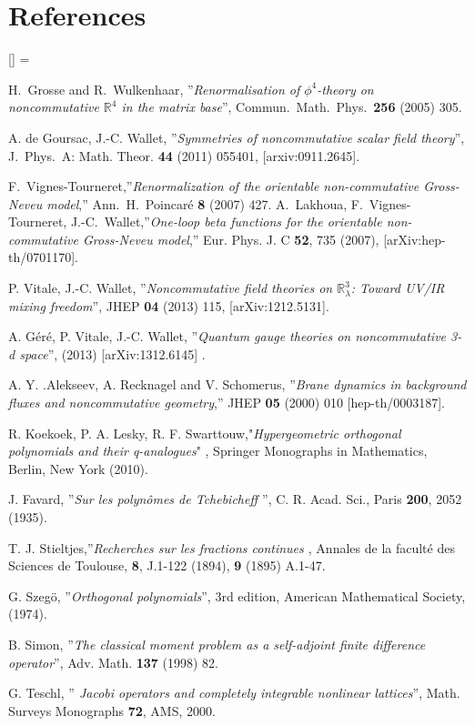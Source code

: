 \documentclass[a4paper,11pt,twoside]{article}
\numberwithin{equation}{section}
\theoremstyle{nonumberplain}
\newcounter{and}
\renewenvironment{thebibliography}[1]{%
\section*{References}%
\frenchspacing\small%
\begin{list}{[\arabic{enumi}]}%
{%
\usecounter{enumi}\parsep=2pt\topsep 0pt%
\settowidth{\labelwidth}{[#1]}%
\leftmargin=\labelwidth\advance\leftmargin\labelsep%
\rightmargin=0pt\itemsep=1pt\sloppy%
}%
}{\end{list}}
\begin{document}
\begin{thebibliography}{50}
H.~Grosse and R.~Wulkenhaar, ''{\it{Renormalisation of $\phi^4$-theory on noncommutative $\mathbb{R}^4$ in the matrix base}}'', 
Commun.\ Math.\ Phys.\  {\bf 256} (2005) 305.

 A. de Goursac, J.-C. Wallet, ''{\it{Symmetries of noncommutative scalar field theory}}'', J.\ Phys.\ A: Math. Theor. {\bf{44}} (2011) 055401, [arxiv:0911.2645]. 

F.~Vignes-Tourneret,''{\it{Renormalization of the orientable non-commutative Gross-Neveu model}},''  Ann.\ H.\ Poincar\'e {\bf{8}} (2007) 427. 
A.~Lakhoua, 
F.~Vignes-Tourneret, J.-C.~Wallet,''{\it{One-loop beta functions for the orientable non-commutative Gross-Neveu
 model}},'' Eur. Phys. J. C {\bf{52}}, 735 (2007), [arXiv:hep-th/0701170].

 P. Vitale, J.-C. Wallet, ''{\it{Noncommutative field theories on $\mathbb{R}^3_\lambda$: Toward UV/IR mixing freedom}}'', JHEP {\bf{04}} (2013) 115, [arXiv:1212.5131].

 A. G\'er\'e, P. Vitale, J.-C. Wallet, ''{\it{Quantum gauge theories on noncommutative 3-d space}}'', (2013) [arXiv:1312.6145] .

 A. Y. .Alekseev, A. Recknagel and V. Schomerus, ''{\it{Brane dynamics in background fluxes and
noncommutative geometry}},'' JHEP {\bf{05}} (2000) 010 [hep-th/0003187].

 R. Koekoek, P. A.  Lesky, R. F. Swarttouw,"{\it{Hypergeometric orthogonal polynomials and their q-analogues}}" , Springer Monographs in Mathematics, Berlin, New York (2010).

 J. Favard, ''{\it{Sur les polyn\^omes de Tchebicheff }}'', C. R. Acad. Sci., Paris {\bf{200}}, 2052 (1935).

 T. J. Stieltjes,''{\it{Recherches sur les fractions continues }}, Annales de la facult\'e des Sciences de Toulouse, {\bf{8}}, J.1-122 (1894), {\bf{9}} (1895) A.1-47.

 G. Szeg\"o, ''{\it{Orthogonal polynomials}}'', 3rd edition, American Mathematical Society, (1974).

 B. Simon, ''{\it{The classical moment problem as a self-adjoint finite difference operator}}'', Adv. Math. {\bf{137}} (1998) 82.

 G. Teschl, ''{\it{ Jacobi operators and completely integrable nonlinear lattices}}'', Math. Surveys Monographs {\bf{72}}, AMS, 2000.


\end{thebibliography}
\end{document}
